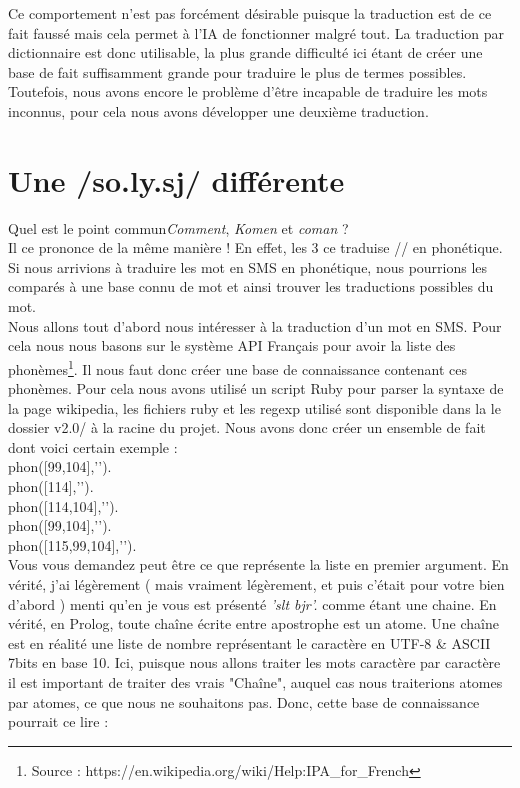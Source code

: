 \documentclass[11pt]{report}
\begin{document}
	Ce comportement n'est pas forcément désirable puisque la traduction est de ce fait faussé mais cela permet à l'IA de fonctionner malgré tout.
	La traduction par dictionnaire est donc utilisable, la plus grande difficulté ici étant de créer une base de fait suffisamment grande pour traduire le plus de termes possibles.\\
	Toutefois, nous avons encore le problème d'être incapable de traduire les mots inconnus, pour cela nous avons développer une deuxième traduction.
	
	\section{Une /so.ly.sj/ différente}
	Quel est le point commun{\em Comment}, {\em Komen} et {\em coman} ?\\
	Il ce prononce de la même manière ! En effet, les 3 ce traduise // en phonétique. Si nous arrivions à traduire les mot en SMS en phonétique, nous pourrions les comparés à une base connu de mot et ainsi trouver les traductions possibles du mot.\\
	Nous allons tout d'abord nous intéresser à la traduction d'un mot en SMS. Pour cela nous nous basons sur le système API Français pour avoir la liste des phonèmes\footnote{Source : https://en.wikipedia.org/wiki/Help:IPA\_for\_French}. Il nous faut donc créer une base de connaissance contenant ces phonèmes. Pour cela nous avons utilisé un script Ruby pour parser la syntaxe de la page wikipedia, les fichiers ruby et les regexp utilisé sont disponible dans la le dossier v2.0/ à la racine du projet.
	Nous avons donc créer un ensemble de fait dont voici certain exemple :\\
	
	\indent phon([99,104],'').\\
	\indent phon([114],'').\\
	\indent phon([114,104],'').\\
	\indent phon([99,104],'').\\
	\indent phon([115,99,104],'').\\
	
	Vous vous demandez peut être ce que représente la liste en premier argument. En vérité, j'ai légèrement ( mais vraiment légèrement, et puis c'était pour votre bien d'abord ) menti qu'en je vous est présenté {\em 'slt bjr'.} comme étant une chaine. En vérité, en Prolog, toute chaîne écrite entre apostrophe est un atome. Une chaîne est en réalité une liste de nombre représentant le caractère en UTF-8 \& ASCII 7bits en base 10. Ici, puisque nous allons traiter les mots caractère par caractère il est important de traiter des vrais "Chaîne", auquel cas nous traiterions atomes par atomes, ce que nous ne souhaitons pas. Donc, cette base de connaissance pourrait ce lire :\\
	
\end{document}
